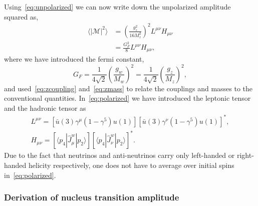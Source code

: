 Using~\eqref{eq:unpolarized} we can now write down the unpolarized amplitude squared as,
\begin{align}
\langle |\mathcal{M}|^2 \rangle &=\left( \frac{g_z^2}{16M_z^2} \right) ^2 L^{\mu \nu}H_{\mu \nu} \nonumber \\
&= \frac{G_F^2}{8} L^{\mu \nu}H_{\mu \nu}, \label{eq:polarized}
\end{align}
where we have introduced the fermi constant,
\begin{equation}
G_F=\frac{1}{4\sqrt{2}}\left( \frac{g_w}{M_w}\right) ^2=\frac{1}{4\sqrt{2}}\left( \frac{g_z}{M_z}\right) ^2,
\end{equation}
and used~\eqref{eq:zcoupling} and~\eqref{eq:zmass} to relate the couplings and masses to the conventional quantities. In~\eqref{eq:polarized} we have introduced the leptonic tensor and the hadronic tensor as
\begin{gather}
L^{\mu \nu}= [\bar{u}(3)\gamma ^{\mu}(1-\gamma ^{5})u(1)][\bar{u}(3)\gamma ^{\nu}(1-\gamma ^{5})u(1)]^*, \label{eq:leptonic} \\
H_{\mu \nu}= [\langle p_4|\hat{J}_{\mu}^{w}|p_2 \rangle][\langle p_4|\hat{J}_{\nu}^{w}|p_2 \rangle]^*. \label{eq:hadronic}
\end{gather}
Due to the fact that neutrinos and anti-neutrinos carry only left-handed or right-handed helicity respectively, one does not have to average over initial spins in~\eqref{eq:polarized}.

\subsubsection{Derivation of nucleus transition amplitude}

